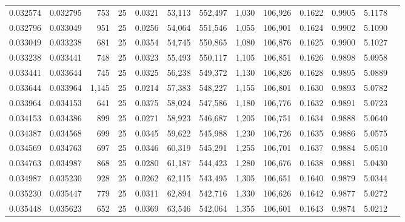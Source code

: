 \begin{tabular}{rrrrrrrrrrrrr}
0.032574 & 0.032795 &   753 &  25 &                                     0.0321 &  53,113 & 552,497 &   1,030 & 106,926 & 0.1622 & 0.9905 & 5.1178 \\
0.032796 & 0.033049 &   951 &  25 &                                     0.0256 &  54,064 & 551,546 &   1,055 & 106,901 & 0.1624 & 0.9902 & 5.1090 \\
0.033049 & 0.033238 &   681 &  25 &                                     0.0354 &  54,745 & 550,865 &   1,080 & 106,876 & 0.1625 & 0.9900 & 5.1027 \\
0.033238 & 0.033441 &   748 &  25 &                                     0.0323 &  55,493 & 550,117 &   1,105 & 106,851 & 0.1626 & 0.9898 & 5.0958 \\
0.033441 & 0.033644 &   745 &  25 &                                     0.0325 &  56,238 & 549,372 &   1,130 & 106,826 & 0.1628 & 0.9895 & 5.0889 \\
0.033644 & 0.033964 & 1,145 &  25 &                                     0.0214 &  57,383 & 548,227 &   1,155 & 106,801 & 0.1630 & 0.9893 & 5.0782 \\
0.033964 & 0.034153 &   641 &  25 &                                     0.0375 &  58,024 & 547,586 &   1,180 & 106,776 & 0.1632 & 0.9891 & 5.0723 \\
0.034153 & 0.034386 &   899 &  25 &                                     0.0271 &  58,923 & 546,687 &   1,205 & 106,751 & 0.1634 & 0.9888 & 5.0640 \\
0.034387 & 0.034568 &   699 &  25 &                                     0.0345 &  59,622 & 545,988 &   1,230 & 106,726 & 0.1635 & 0.9886 & 5.0575 \\
0.034569 & 0.034763 &   697 &  25 &                                     0.0346 &  60,319 & 545,291 &   1,255 & 106,701 & 0.1637 & 0.9884 & 5.0510 \\
0.034763 & 0.034987 &   868 &  25 &                                     0.0280 &  61,187 & 544,423 &   1,280 & 106,676 & 0.1638 & 0.9881 & 5.0430 \\
0.034987 & 0.035230 &   928 &  25 &                                     0.0262 &  62,115 & 543,495 &   1,305 & 106,651 & 0.1640 & 0.9879 & 5.0344 \\
0.035230 & 0.035447 &   779 &  25 &                                     0.0311 &  62,894 & 542,716 &   1,330 & 106,626 & 0.1642 & 0.9877 & 5.0272 \\
0.035448 & 0.035623 &   652 &  25 &                                     0.0369 &  63,546 & 542,064 &   1,355 & 106,601 & 0.1643 & 0.9874 & 5.0212 \\

\end{tabular}
